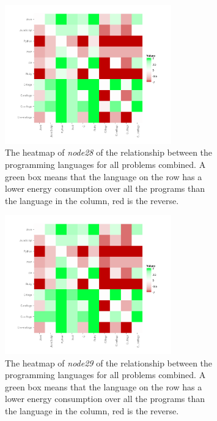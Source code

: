 \begin{figure}[h]
    \begin{subfigure}[b]{0.45\textwidth}
        \includegraphics[width=\textwidth, height=6cm]{graphs/heatmapL3.png}
        \caption{The heatmap of \textit{node28} of the relationship between the programming languages for all problems combined. A green box means that the language on the row has a lower energy consumption over all the programs than the language in the column, red is the reverse.}
        \label{fig:heatmap_L3}
    \end{subfigure}
    \hfill        
    \begin{subfigure}[b]{0.45\textwidth}
        \includegraphics[width=\textwidth, height=6cm]{graphs/heatmapL2.png}
        \caption{The heatmap of \textit{node29} of the relationship between the programming languages for all problems combined. A green box means that the language on the row has a lower energy consumption over all the programs than the language in the column, red is the reverse.}
        \label{fig:heatmap_L2}
    \end{subfigure}
    \caption{}
    \label{fig:heatmap_L}
\end{figure}

